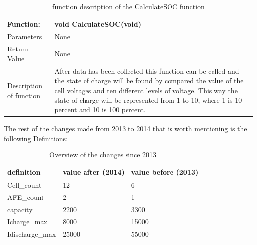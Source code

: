 \begin{table}[h!]
	\centering
	\label{CalculateSOCfunction}
	\begin{tabular}{|p{4 cm}|p{9 cm}|}
		\hline
		\textbf{Function:} & \textbf{void CalculateSOC(void)}	\\\hline
		Parameters	& None	\\\hline
		Return Value	& None	\\\hline
		Description of function	& After data has been collected this function can be called and the state of charge will be found by compared the value of the cell voltages and ten different levels of voltage. This way the state of charge will be represented from 1 to 10, where 1 is 10 percent and 10 is 100 percent.	\\\hline
	\end{tabular}
	\caption{function description of the CalculateSOC function}
\end{table}

The rest of the changes made from 2013 to 2014 that is worth mentioning is the following Definitions:\\
\begin{table}[h!]
	\centering
	\label{changedDefines}
	\begin{tabular}{|p{4 cm}|p{4 cm}|p{4 cm}|}
		\hline
		\textbf{definition} & \textbf{value after (2014)}	& \textbf{value before (2013)}	\\\hline
		Cell\_count	& 12	& 6	\\\hline
		AFE\_count	& 2	& 1	\\\hline
		capacity	& 2200	& 3300	\\\hline
		Icharge\_max	& 8000	& 15000	\\\hline
		Idischarge\_max	& 25000	& 55000	\\\hline
	\end{tabular}
	\caption{Overview of the changes since 2013}
\end{table}

